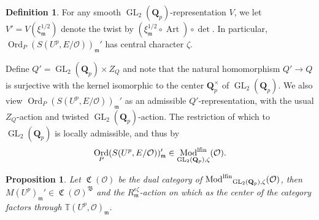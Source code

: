 \documentclass[leqno]{amsart}
\newtheorem{prop}[thm]{Proposition}
\theoremstyle{definition}
\newtheorem{defn}[thm]{Definition}
\theoremstyle{remark}
\newcommand{\oo}{\mathcal{O}}
\newcommand{\Qp}{\mathbf{Q}_p}
\DeclareMathOperator{\GL}{GL}
\DeclareMathOperator{\Art}{Art}
\newcommand{\fm}{\mathfrak{m}}
\DeclareMathOperator{\lfMod}{\textnormal{Mod}^{\textnormal{lfin}}}
\DeclareMathOperator{\fC}{\mathfrak{C}} %
\DeclareMathOperator{\Ord}{Ord} %
\newcommand{\B}{\mathfrak B} %
\newcommand{\TT}{\mathbb{T}} %
\begin{document}
\begin{defn}\label{def:twist}
	For any smooth $\GL_2(\Qp)$-representation
	$V$,
	we let $V'=V(\xi_{\fm}^{1/2})$
	denote the twist 
	by $(\xi_{\fm}^{1/2}\circ\Art)\circ \det$.
	In particular, 
	$\Ord_P(S(U^p,E/\oo))_{\fm}'$
	has central character $\zeta$.

	Define $Q'=\GL_2(\Qp)\times Z_Q$
	and note that the natural 
	homomorphism  $Q'\to Q$
	is surjective with the kernel
	isomorphic to the center  $\Qp^\times$
	of  $\GL_2(\Qp)$.
	We also view
	$\Ord_P(S(U^p,E/\oo))_{\fm}'$
	as an admissible $Q'$-representation,
	with the usual $Z_Q$-action
	and twisted $\GL_2(\Qp)$-action.
	The restriction of which to $\GL_2(\Qp)$
	is locally admissible,
	and thus by \cite[Thm 2.3.8]{emeI}
	\[
		\Ord_P(S(U^p,E/\oo))_{\fm}'\in \lfMod_{\GL_2(\Qp),\zeta}(\oo).
	\]
\end{defn}


\begin{prop}\label{prop:compatibility}
	Let $\fC(\oo)$ be the dual category of 
	$\lfMod_{\GL_2(\Qp),\zeta}(\oo)$, then 
	$M(U^p)_{\fm}'\in \fC(\oo)^{\B}$
	and the $R_\fm^{\epsilon\zeta}$-action on which
	as the center of the category
	factors through $\TT(U^p,\oo)_\fm$.
\end{prop}
\end{document}
